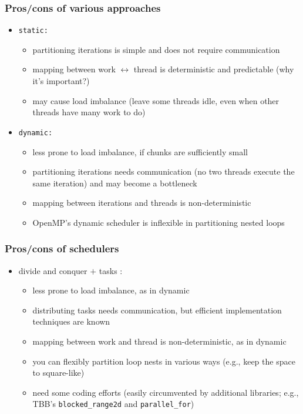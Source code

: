 \documentclass[12pt,dvipdfmx]{beamer}
\newcommand{\ao}[1]{{\color{blue}#1}}
\newcommand{\aka}[1]{{\color{red}#1}}
\begin{document}
\begin{frame}[fragile]
\frametitle{Pros/cons of various approaches}
\begin{itemize}
\item {\tt static:}
  \begin{itemize}
  \item partitioning iterations is \ao{simple and does not require communication}
  \item mapping between work $\leftrightarrow$ thread is
    \ao{deterministic and predictable} (why it's important?)
  \item may cause \aka{load imbalance} (leave some threads idle,
    even when other threads have many work to do)
  \end{itemize}

\item {\tt dynamic:}
  \begin{itemize}
  \item \ao{less prone to load imbalance},
    if chunks are sufficiently small

  \item partitioning iterations \aka{needs
    communication} (no two threads execute the same
    iteration) and may become a bottleneck

  \item mapping between iterations and threads is
    \aka{non-deterministic}

  \item OpenMP's dynamic scheduler is \aka{inflexible
    in partitioning nested loops}
  \end{itemize}
\end{itemize}
\end{frame}


\begin{frame}[fragile]
\frametitle{Pros/cons of schedulers}
\begin{itemize}
\item divide and conquer $+$ tasks :
  \begin{itemize}
  \item \ao{less prone to load imbalance}, as in dynamic

  \item distributing tasks \aka{needs communication, but efficient implementation techniques are known}

  \item mapping between work and thread is
    \aka{non-deterministic}, as in dynamic

  \item you can \aka{flexibly partition loop nests} in
    various ways (e.g., keep the space to square-like)

  \item need some \aka{coding efforts}
    (easily circumvented by additional libraries; 
    e.g., TBB's {\tt blocked\_range2d} and {\tt parallel\_for})

  \end{itemize}
\end{itemize}
\end{frame}
\end{document}
